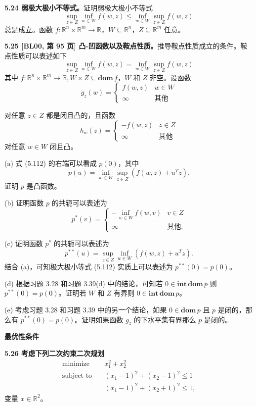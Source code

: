 \documentclass[UTF8, 12pt, fontset=fandol, oneside]{ctexart}
\begin{document}
\noindent\textbf{5.24 弱极大极小不等式。}\quad 证明弱极大极小不等式
\[
\sup_{z\in Z}\inf_{w\in W}f(w,z)\leq \inf_{w\in W}\sup_{z\in Z}f(w,z)
\]
总是成立。函数 $f:\mathbb{R}^n\times\mathbb{R}^m\to\mathbb{R}$，$W\subseteq\mathbb{R}^n$，$Z\subseteq\mathbb{R}^m$ 任意。

\noindent\textbf{5.25 [BL00, 第 95 页] 凸-凹函数以及鞍点性质。}\quad 推导鞍点性质成立的条件。鞍点性质可以表述如下
\begin{equation}
\sup_{z\in Z}\inf_{w\in W}f(w,z)=\inf_{w\in W}\sup_{z\in Z}f(w,z)
\tag{5.112}
\end{equation}
其中 $f:\mathbb{R}^n\times\mathbb{R}^m\to\mathbb{R}, W\times Z\subseteq\mathbf{dom}\,f$，$W$ 和 $Z$ 非空。设函数
\[
g_z(w)=
\begin{cases}
f(w,z) & w\in W\\
\infty & \text{其他}
\end{cases}
\]

对任意 $z\in Z$ 都是闭且凸的，且函数
\[
h_w(z)=
\begin{cases}
-f(w,z) & z\in Z\\
\infty & \text{其他}
\end{cases}
\]
对任意 $w\in W$ 闭且凸。

(a) 式 (5.112) 的右端可以看成 $p(0)$，其中
\[
p(u)=\inf_{w\in W}\sup_{z\in Z}(f(w,z)+u^Tz).
\]
证明 $p$ 是凸函数。

(b) 证明函数 $p$ 的共轭可以表述为
\[
p^\ast(v)=
\begin{cases}
-\inf_{w\in W}f(w,v) & v\in Z\\
\infty & \text{其他}.
\end{cases}
\]

(c) 证明函数 $p^\ast$ 的共轭可以表述为
\[
p^{\ast\ast}(u)=\sup_{z\in Z}\inf_{w\in W}(f(w,z)+u^Tz).
\]
结合 (a)，可知极大极小等式 (5.112) 实质上可以表述为 $p^{\ast\ast}(0)=p(0)$。

(d) 根据习题 3.28 和习题 3.39(d) 中的结论，可知若 $0\in\mathbf{int}\,\mathbf{dom}\,p$ 则 $p^{\ast\ast}(0)=p(0)$。证明若 $W$ 和 $Z$ 有界则 $0\in\mathbf{int}\,\mathbf{dom}\,p$。

(e) 考虑习题 3.28 和习题 3.39 中的另一个结论，如果 $0\in\mathbf{dom}\,p$ 且 $p$ 是闭的，那么有 $p^{\ast\ast}(0)=p(0)$。证明如果函数 $g_z$ 的下水平集有界那么 $p$ 是闭的。

\noindent\textbf{最优性条件}

\noindent\textbf{5.26 考虑下列二次约束二次规划}
\[
\begin{aligned}
\text{minimize}\quad & x_1^2+x_2^2\\
\text{subject to}\quad & (x_1-1)^2+(x_2-1)^2\leq 1\\
& (x_1-1)^2+(x_2+1)^2\leq 1,
\end{aligned}
\]
变量 $x\in\mathbb{R}^2$。
\end{document}
